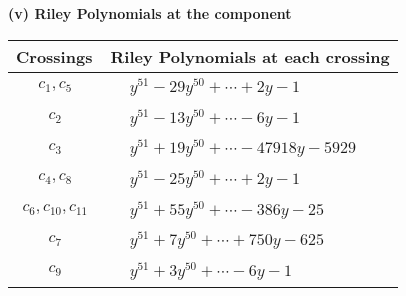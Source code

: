 \documentclass[1p]{elsarticle_modified}
\theoremstyle{definition}
\begin{document}
\newpage\renewcommand{\arraystretch}{1}
\flushleft \textbf{(v) Riley Polynomials at the component}\newline \\
\begin{tabular}{m{50pt}|m{274pt}}
Crossings & \hspace{64pt}Riley Polynomials at each crossing \\
\hline $$\begin{aligned}c_{1},c_{5}\end{aligned}$$&$\begin{aligned}
&y^{51}-29 y^{50}+\cdots+2 y-1
\end{aligned}$\\
\hline $$\begin{aligned}c_{2}\end{aligned}$$&$\begin{aligned}
&y^{51}-13 y^{50}+\cdots-6 y-1
\end{aligned}$\\
\hline $$\begin{aligned}c_{3}\end{aligned}$$&$\begin{aligned}
&y^{51}+19 y^{50}+\cdots-47918 y-5929
\end{aligned}$\\
\hline $$\begin{aligned}c_{4},c_{8}\end{aligned}$$&$\begin{aligned}
&y^{51}-25 y^{50}+\cdots+2 y-1
\end{aligned}$\\
\hline $$\begin{aligned}c_{6},c_{10},c_{11}\end{aligned}$$&$\begin{aligned}
&y^{51}+55 y^{50}+\cdots-386 y-25
\end{aligned}$\\
\hline $$\begin{aligned}c_{7}\end{aligned}$$&$\begin{aligned}
&y^{51}+7 y^{50}+\cdots+750 y-625
\end{aligned}$\\
\hline $$\begin{aligned}c_{9}\end{aligned}$$&$\begin{aligned}
&y^{51}+3 y^{50}+\cdots-6 y-1
\end{aligned}$\\
\hline
\end{tabular}\\~\\
\end{document}
